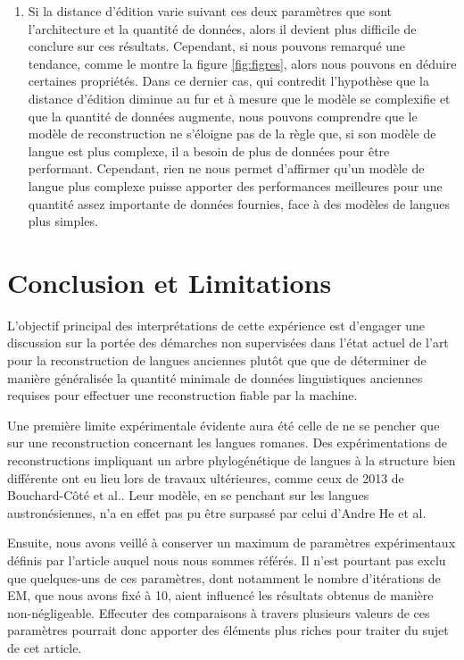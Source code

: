 \documentclass[10pt, french]{article}
\begin{document}
\begin{multicols*}{2}
\begin{enumerate}
    \item Si la distance d'édition varie suivant ces deux paramètres que sont l'architecture et la quantité de données, alors il devient plus difficile de conclure sur ces résultats. Cependant, si nous pouvons remarqué une tendance, comme le montre la figure \ref{fig:figres}, alors nous pouvons en déduire certaines propriétés. Dans ce dernier cas, qui contredit l'hypothèse que la distance d'édition diminue au fur et à mesure que le modèle se complexifie et que la quantité de données augmente, nous pouvons comprendre que le modèle de reconstruction ne s'éloigne pas de la règle que, si son modèle de langue est plus complexe, il a besoin de plus de données pour être performant. Cependant, rien ne nous permet d'affirmer qu'un modèle de langue plus complexe puisse apporter des performances meilleures pour une quantité assez importante de données fournies, face à des modèles de langues plus simples.
\end{enumerate}

\section{Conclusion et Limitations}
L'objectif principal des interprétations de cette expérience est d'engager une discussion sur la portée des démarches non supervisées dans l'état actuel de l'art pour la reconstruction de langues anciennes plutôt que que de déterminer de manière généralisée la quantité minimale de données linguistiques anciennes requises pour effectuer une reconstruction fiable par la machine.

Une première limite expérimentale évidente aura été celle de ne se pencher que sur une reconstruction concernant les langues romanes. Des expérimentations de reconstructions impliquant un arbre phylogénétique de langues à la structure bien différente ont eu lieu lors de travaux ultérieures, comme ceux de 2013 de Bouchard-Côté et al.\cite{bouchard_austro}. Leur modèle, en se penchant sur les langues austronésiennes\cite{greenville}, n'a en effet pas pu être surpassé par celui d'Andre He et al. \cite{andre}

Ensuite, nous avons veillé à conserver un maximum de paramètres expérimentaux définis par l'article auquel nous nous sommes référés. Il n'est pourtant pas exclu que quelques-uns de ces paramètres, dont notamment le nombre d'itérations de EM, que nous avons fixé à 10, aient influencé les résultats obtenus de manière non-négligeable. Effecuter des comparaisons à travers plusieurs valeurs de ces paramètres pourrait donc apporter des éléments plus riches pour traiter du sujet de cet article.


\end{multicols*}
\end{document}
